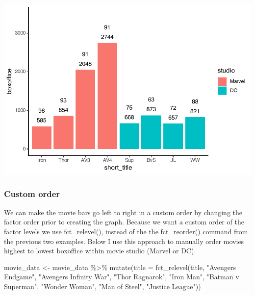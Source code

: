 \documentclass[
]{krantz}
\makeatletter
\newenvironment{Shaded}{\begin{snugshade}}{\end{snugshade}}
\newcommand{\AttributeTok}[1]{\textcolor[rgb]{0.61,0.61,0.61}{#1}}
\newcommand{\FunctionTok}[1]{\textcolor[rgb]{0,0,0}{#1}}
\newcommand{\NormalTok}[1]{#1}
\newcommand{\OtherTok}[1]{\textcolor[rgb]{0.37,0.37,0.37}{#1}}
\newcommand{\SpecialCharTok}[1]{\textcolor[rgb]{0,0,0}{#1}}
\newcommand{\StringTok}[1]{\textcolor[rgb]{0.5,0.5,0.5}{#1}}
\newenvironment{kframe}{%
\medskip{}
\setlength{\fboxsep}{.8em}
 \def\at@end@of@kframe{}%
 \ifinner\ifhmode%
  \def\at@end@of@kframe{\end{minipage}}%
  \begin{minipage}{\columnwidth}%
 \fi\fi%
 \def\FrameCommand##1{\hskip\@totalleftmargin \hskip-\fboxsep
 \colorbox{shadecolor}{##1}\hskip-\fboxsep
     \hskip-\linewidth \hskip-\@totalleftmargin \hskip\columnwidth}%
 \MakeFramed {\advance\hsize-\width
   \@totalleftmargin\z@ \linewidth\hsize
   \@setminipage}}%
 {\par\unskip\endMakeFramed%
 \at@end@of@kframe}
\renewenvironment{Shaded}{\begin{kframe}}{\end{kframe}}
\makeatother
\begin{document}
\includegraphics[width=0.65\linewidth]{bookdown_files/figure-latex/unnamed-chunk-122-1}

\hypertarget{custom-order}{%
\subsubsection{Custom order}\label{custom-order}}

We can make the movie bars go left to right in a custom order by changing the factor order prior to creating the graph. Because we want a custom order of the factor levels we use fct\_relevel(), instead of the the fct\_reorder() command from the previous two examples. Below I use this approach to manually order movies highest to lowest boxoffice within movie studio (Marvel or DC).

\begin{Shaded}
\begin{Highlighting}[]
\NormalTok{movie\_data }\OtherTok{\textless{}{-}}\NormalTok{ movie\_data }\SpecialCharTok{\%\textgreater{}\%} 
  \FunctionTok{mutate}\NormalTok{(}\AttributeTok{title =} \FunctionTok{fct\_relevel}\NormalTok{(title,}
                             \StringTok{"Avengers Endgame"}\NormalTok{,}
                             \StringTok{"Avengers Infinity War"}\NormalTok{,}
                             \StringTok{"Thor Ragnarok"}\NormalTok{,}
                             \StringTok{"Iron Man"}\NormalTok{,}
                             \StringTok{"Batman v Superman"}\NormalTok{,}
                             \StringTok{"Wonder Woman"}\NormalTok{,}
                             \StringTok{"Man of Steel"}\NormalTok{,}
                             \StringTok{"Justice League"}\NormalTok{))}
\end{Highlighting}
\end{Shaded}
\end{document}

